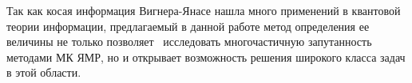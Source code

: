 Так как косая информация Вигнера-Янасе нашла много применений в квантовой теории информации, %
предлагаемый в данной работе метод определения ее величины
не только позволяет~\cite{Doronin2021} исследовать многочастичную запутанность методами МК ЯМР,
но и открывает возможность решения широкого класса задач в этой области.